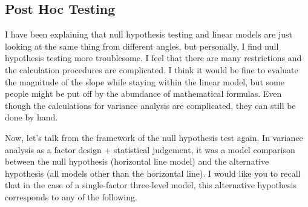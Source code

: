 \documentclass{ltjbook}
\begin{document}
\subsection{Post Hoc Testing}
I have been explaining that null hypothesis testing and linear models are just looking at the same thing from different angles, but personally, I find null hypothesis testing more troublesome. I feel that there are many restrictions and the calculation procedures are complicated. I think it would be fine to evaluate the magnitude of the slope while staying within the linear model, but some people might be put off by the abundance of mathematical formulas. Even though the calculations for variance analysis are complicated, they can still be done by hand.

Now, let's talk from the framework of the null hypothesis test again. In variance analysis as a factor design + statistical judgement, it was a model comparison between the null hypothesis (horizontal line model) and the alternative hypothesis (all models other than the horizontal line). I would like you to recall that in the case of a single-factor three-level model, this alternative hypothesis corresponds to any of the following.
\end{document}
